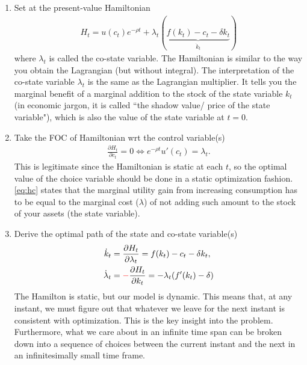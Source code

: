 \documentclass[11pt,a4paper]{book}
\newcommand{\red}[1]{\textcolor{red}{#1}}
\theoremstyle{definition}\newtheorem{definition}{Definition}
\theoremstyle{definition}\newtheorem{fact}{Fact}
\theoremstyle{definition}\newtheorem{remark}{Remark}
\theoremstyle{definition}\newtheorem{ex}{Ex.}
\theoremstyle{definition}\newtheorem{project}{Project}
\theoremstyle{definition}\newtheorem{problem}{Problem}
\theoremstyle{definition}\newtheorem{example}{Example}
\numberwithin{theorem}{section}
\numberwithin{corollary}{chapter}
\numberwithin{assumption}{chapter}
\numberwithin{definition}{chapter}
\numberwithin{prop}{chapter}
\numberwithin{notation}{chapter}
\numberwithin{problem}{chapter}
\numberwithin{example}{chapter}
\numberwithin{fact}{chapter}
\numberwithin{ex}{chapter}
\begin{document}
	\begin{enumerate}
		\item Set at the present-value Hamiltonian
		\begin{align}
			H_t = u(c_t)e^{-\rho t} + \lambda_t ( \underbrace{f(k_t) - c_t - \delta k_t}_{\dot{k}_t})
		\end{align}
		where $\lambda_t$ is called the co-state variable. The Hamiltonian is similar to the way you obtain the Lagrangian (but without integral). The interpretation of the co-state variable $\lambda_t$ is the same as the Lagrangian multiplier. It tells you the marginal benefit of a marginal addition to the stock of the state variable $k_t$ (in economic jargon, it is called ``the shadow value/ price of the state variable"), which is also the value of the state variable at $t=0$.
				
		\item Take the FOC of Hamiltonian wrt the control variable(s)
		\begin{align}
			\frac{\partial H_t}{\partial c_t} = 0 \Leftrightarrow e^{-\rho t} u'(c_t) = \lambda_t. \label{eq:hc}
		\end{align}
		This is legitimate since the Hamiltonian is static at each $t$, so the optimal value of the choice variable should be done in a static optimization fashion. \eqref{eq:hc} states that the marginal utility gain from increasing consumption has to be equal to the marginal cost ($\lambda$) of not adding such amount to the stock of your assets (the state variable).
		
		\item Derive the optimal path of the state and co-state variable(s)
		\begin{align}
			\dot{k}_t &= \frac{\partial H_t}{\partial \lambda_t} = f(k_t) - c_t - \delta k_t, \label{eq:kdot} \\
			\dot{\lambda}_t &= \red{-} \frac{\partial H_t}{\partial k_t} = - \lambda_t (f'(k_t) - \delta) \label{eq:costate}
		\end{align}
		The Hamilton is static, but our model is dynamic. This means that, at any instant, we must figure out that whatever we leave for the next instant is consistent with optimization. This is the key insight into the problem. Furthermore, what we care about in an infinite time span can be broken down into a sequence of choices between the current instant and the next in an infinitesimally small time frame.
		

\end{enumerate}
\end{document}
